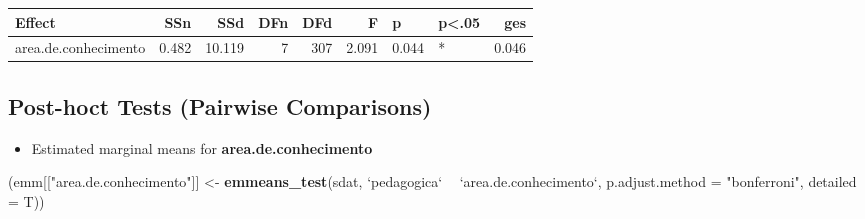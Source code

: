 \documentclass[]{article}
\newenvironment{Shaded}{\begin{snugshade}}{\end{snugshade}}
\newcommand{\DataTypeTok}[1]{\textcolor[rgb]{0.13,0.29,0.53}{#1}}
\newcommand{\KeywordTok}[1]{\textcolor[rgb]{0.13,0.29,0.53}{\textbf{#1}}}
\newcommand{\NormalTok}[1]{#1}
\newcommand{\OperatorTok}[1]{\textcolor[rgb]{0.81,0.36,0.00}{\textbf{#1}}}
\newcommand{\StringTok}[1]{\textcolor[rgb]{0.31,0.60,0.02}{#1}}
\providecommand{\tightlist}{%
  \setlength{\itemsep}{0pt}\setlength{\parskip}{0pt}}
\begin{document}
\begin{longtable}[]{@{}lrrrrrllr@{}}
\toprule
Effect & SSn & SSd & DFn & DFd & F & p & p\textless{}.05 &
ges\tabularnewline
\midrule
\endhead
area.de.conhecimento & 0.482 & 10.119 & 7 & 307 & 2.091 & 0.044 & * &
0.046\tabularnewline
\bottomrule
\end{longtable}

\hypertarget{post-hoct-tests-pairwise-comparisons}{%
\subsection{Post-hoct Tests (Pairwise
Comparisons)}\label{post-hoct-tests-pairwise-comparisons}}

\begin{itemize}
\tightlist
\item
  Estimated marginal means for \textbf{area.de.conhecimento}
\end{itemize}

\begin{Shaded}
\begin{Highlighting}[]
\NormalTok{(emm[[}\StringTok{"area.de.conhecimento"}\NormalTok{]] <-}\StringTok{ }\KeywordTok{emmeans_test}\NormalTok{(sdat, }\StringTok{`}\DataTypeTok{pedagogica}\StringTok{`} \OperatorTok{~}\StringTok{ `}\DataTypeTok{area.de.conhecimento}\StringTok{`}\NormalTok{, }\DataTypeTok{p.adjust.method =} \StringTok{"bonferroni"}\NormalTok{, }\DataTypeTok{detailed =}\NormalTok{ T))}
\end{Highlighting}
\end{Shaded}
\end{document}

